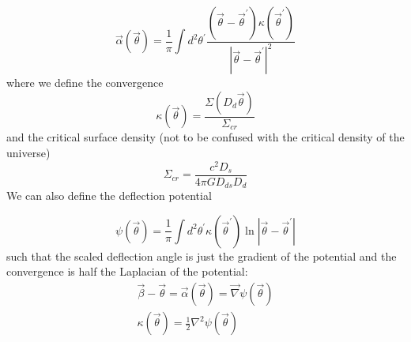 \begin{equation}
{\displaystyle {\vec {\alpha }}({\vec {\theta }})={\frac {1}{\pi }}\int d^{2}\theta ^{\prime }{\frac {({\vec {\theta }}-{\vec {\theta }}^{\prime })\kappa ({\vec {\theta }}^{\prime })}{|{\vec {\theta }}-{\vec {\theta }}^{\prime }|^{2}}}}%
\end{equation}
where we define the convergence
\begin{equation}
{\displaystyle \kappa ({\vec {\theta }})={\frac {\Sigma (D_{d}{\vec {\theta }})}{\Sigma _{cr}}}}%
\end{equation}
and the critical surface density (not to be confused with the critical density of the universe)
\begin{equation}
{\displaystyle \Sigma _{cr}={\frac {c^{2}D_{s}}{4\pi GD_{ds}D_{d}}}}
\end{equation}
We can also define the deflection potential

\begin{equation}
{\displaystyle \psi ({\vec {\theta }})={\frac {1}{\pi }}\int d^{2}\theta ^{\prime }\kappa ({\vec {\theta }}^{\prime })\ln |{\vec {\theta }}-{\vec {\theta }}^{\prime }|}%
\end{equation}
such that the scaled deflection angle is just the gradient of the potential and the convergence is half the Laplacian of the potential:
\begin{eqnarray}
{\displaystyle {\vec {\beta }}-{\vec {\theta }}={\vec {\alpha }}({\vec {\theta }})={\vec {\nabla }}\psi ({\vec {\theta }})}%
\\
{\displaystyle \kappa ({\vec {\theta }})={\frac {1}{2}}\nabla ^{2}\psi ({\vec {\theta }})}%
\end{eqnarray}

